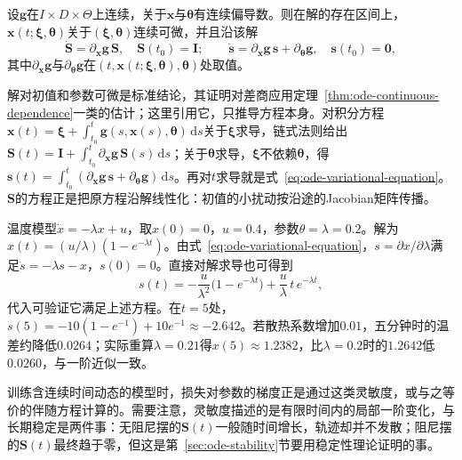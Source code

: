 \begin{theorem}[变分方程]
  \label{thm:ode-variational-equation}
  设$\bm g$在$I\times D\times\Theta$上连续，关于$\bm x$与$\bm\theta$有连续偏导数。则在解的存在区间上，$\bm x(t;\bm\xi,\bm\theta)$关于$(\bm\xi,\bm\theta)$连续可微，并且沿该解
  \begin{equation}
    \dot{\bm S}=\partial_{\bm x}\bm g\,\bm S,\quad\bm S(t_0)=\bm I;\qquad
    \dot{\bm s}=\partial_{\bm x}\bm g\,\bm s+\partial_{\bm\theta}\bm g,\quad\bm s(t_0)=\bm0,
    \label{eq:ode-variational-equation}
  \end{equation}
  其中$\partial_{\bm x}\bm g$与$\partial_{\bm\theta}\bm g$在$(t,\bm x(t;\bm\xi,\bm\theta),\bm\theta)$处取值。
\end{theorem}

解对初值和参数可微是标准结论，其证明对差商应用定理~\ref{thm:ode-continuous-dependence}一类的估计；这里引用它，只推导方程本身。对积分方程$\bm x(t)=\bm\xi+\int_{t_0}^t\bm g(s,\bm x(s),\bm\theta)\,\mathrm ds$关于$\bm\xi$求导，链式法则给出$\bm S(t)=\bm I+\int_{t_0}^t\partial_{\bm x}\bm g\,\bm S(s)\,\mathrm ds$；关于$\bm\theta$求导，$\bm\xi$不依赖$\bm\theta$，得$\bm s(t)=\int_{t_0}^t(\partial_{\bm x}\bm g\,\bm s+\partial_{\bm\theta}\bm g)\,\mathrm ds$。再对$t$求导就是式~\eqref{eq:ode-variational-equation}。$\bm S$的方程正是把原方程沿解线性化：初值的小扰动按沿途的Jacobian矩阵传播。

\begin{example}[散热系数的灵敏度]
  \label{ex:ode-temperature-sensitivity}
  温度模型$\dot x=-\lambda x+u$，取$x(0)=0$，$u=0.4$，参数$\theta=\lambda=0.2$。解为$x(t)=(u/\lambda)(1-e^{-\lambda t})$。由式~\eqref{eq:ode-variational-equation}，$s=\partial x/\partial\lambda$满足$\dot s=-\lambda s-x$，$s(0)=0$。直接对解求导也可得到
  \[
    s(t)=-\frac u{\lambda^2}\bigl(1-e^{-\lambda t}\bigr)+\frac u\lambda\,t\,e^{-\lambda t},
  \]
  代入可验证它满足上述方程。在$t=5$处，$s(5)=-10(1-e^{-1})+10e^{-1}\approx-2.642$。若散热系数增加$0.01$，五分钟时的温差约降低$0.0264$；实际重算$\lambda=0.21$得$x(5)\approx1.2382$，比$\lambda=0.2$时的$1.2642$低$0.0260$，与一阶近似一致。
\end{example}

训练含连续时间动态的模型时，损失对参数的梯度正是通过这类灵敏度，或与之等价的伴随方程计算的。需要注意，灵敏度描述的是有限时间内的局部一阶变化，与长期稳定是两件事：无阻尼摆的$\bm S(t)$一般随时间增长，轨迹却并不发散；阻尼摆的$\bm S(t)$最终趋于零，但这是第~\ref{sec:ode-stability}节要用稳定性理论证明的事。

